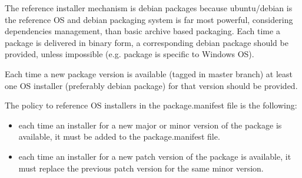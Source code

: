 \documentclass[12pt,a4paper]{article}
\begin{document}
The reference installer mechanism is debian packages because ubuntu/debian is the reference OS and debian packaging system is far most powerful, considering dependencies management, than basic archive based packaging. Each time a package is delivered in binary form, a corresponding debian package should be provided, unless impossible (e.g. package is specific to Windows OS).

Each time a new package version is available (tagged in master branch) at least one OS installer (preferably debian package) for that version should be provided.

The policy to reference OS installers in the package.manifest file is the following:
\begin{itemize}
\item each time an installer for a new major or minor version of the package is available, it must be added to the package.manifest file.
\item each time an installer for a new patch version of the package is available, it must replace the previous patch version for the same minor version.
\end{itemize}
\end{document}
